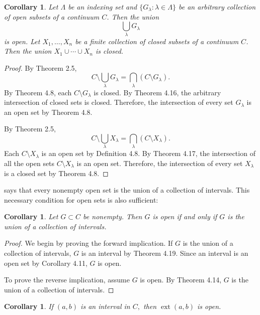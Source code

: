 \documentclass{amsart}
\newtheorem{corollary}[theorem]{Corollary}
\newcommand{\1}{\mathds{1}}
\DeclareMathOperator{\ext}{ext}
\numberwithin{equation}{section}
\numberwithin{theorem}{section}
\begin{document}
\begin{corollary}\label{fortop2} 
	Let $\Lambda$ be an indexing set and $\{G_{\lambda} : \lambda \in \Lambda \}$ be an arbitrary collection of open subsets of a continuum $C$.  Then the union
	\[
	\bigcup_{\lambda} G_{\lambda}
	\]
	is open.  Let $X_1, \dotsc, X_n$ be a finite collection of closed subsets of a continuum $C$.  Then the union $X_1 \cup \dotsm \cup X_n$ is closed.
\end{corollary}

\begin{proof}
	By Theorem 2.5, 
	\[
	C\setminus \bigcup_{\lambda} G_{\lambda} = \bigcap_{\lambda} \left( C\setminus G_{\lambda}\right).
	\]
	By Theorem 4.8, each $C\setminus G_{\lambda}$ is closed. By Theorem 4.16, the arbitrary intersection of closed sets is closed. Therefore, the intersection of every set $G_{\lambda}$ is an open set by Theorem 4.8.
	
	By Theorem 2.5,
	\[
	C\setminus \bigcup_{\lambda} X_{\lambda} = \bigcap_{\lambda} \left( C\setminus X_{\lambda}\right).
	\]
	Each $C\setminus X_{\lambda}$ is an open set by Definition 4.8. By Theorem 4.17, the intersection of all the open sets $C\setminus X_{\lambda}$ is an open set. Therefore, the intersection of every set $X_{\lambda}$ is a closed set by Theorem 4.8.
\end{proof}

 says that every nonempty open set is the union of a collection of intervals.  This necessary condition for open sets is also sufficient:


 \begin{corollary}
 Let $G \subset C$ be nonempty.  Then $G$ is open if and only if $G$ is the union of a collection of intervals.
\end{corollary}

\begin{proof}
	We begin by proving the forward implication. If $G$ is the union of a collection of intervals, $G$ is an interval by Theorem 4.19. Since an interval is an open set by Corollary 4.11, $G$ is open.
	
	To prove the reverse implication, assume $G$ is open. By Theorem 4.14, $G$ is the union of a collection of intervals.
\end{proof}

\begin{corollary} If $(a, b)$ is an interval in $C,$ then $\ext(a,b)$ is open.
\end{corollary} 
\end{document}
